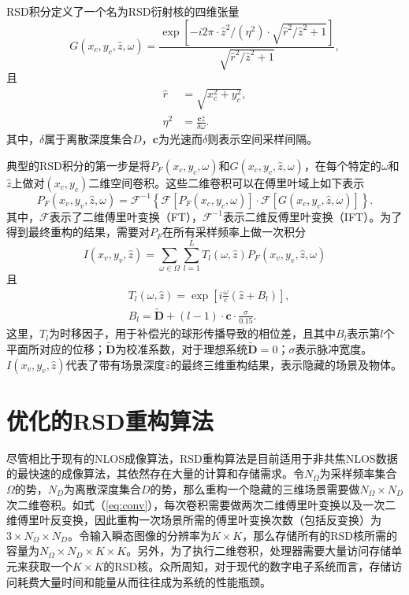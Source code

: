 \documentclass[master]{shtthesis}             %
\begin{document}
RSD积分定义了一个名为RSD衍射核的四维张量
\begin{equation}\label{eq:kernel}
  G(x_c,y_c,\hat{z},\omega) = \frac{\exp\left[-i2\pi\cdot\hat{z}^2/(\eta^2)\cdot\sqrt{\hat{r}^2/\hat{z}^2+1}\right]}{\sqrt{\hat{r}^2/\hat{z}^2+1}},
\end{equation}
且
\begin{align}
  \hat{r} &= \sqrt{x_c^2+y_c^2}\label{eq:rxy},\\
  \eta^2 &= \frac{\mathbf{c}\hat{z}}{\delta\omega}.
\end{align}
其中，$\delta$属于离散深度集合$D$，$\mathbf{c}$为光速而$\delta$则表示空间采样间隔。

典型的RSD积分的第一步是将$P_F(x_c,y_c,\omega)$和$G(x_c,y_c,\hat{z},\omega)$，在每个特定的$\omega$和$\hat{z}$上做对$(x_c,y_c)$二维空间卷积。这些二维卷积可以在傅里叶域上如下表示
\begin{equation}\label{eq:conv}
  P_F(x_v, y_v, \hat{z}, \omega) = \mathcal{F}^{-1}\left\{\mathcal{F}\left[P_F(x_c, y_c, \omega)\right]\cdot \mathcal{F}\left[G(x_c, y_c, \hat{z}, \omega)\right]\right\}.
\end{equation}
其中，$\mathcal{F}$表示了二维傅里叶变换（FT），$\mathcal{F}^{-1}$表示二维反傅里叶变换（IFT）。为了得到最终重构的结果，需要对$P_F$在所有采样频率上做一次积分
\begin{equation}
  I(x_v, y_v, \hat{z}) = \sum_{\omega \in  {\Omega}}\sum_{l=1}^{L} T_l(\omega, \hat{z}) P_F(x_v, y_v, \hat{z}, \omega)
\end{equation}
且
\begin{align}
    &T_l(\omega, \hat{z}) = \exp\left[i\frac{\omega}{c}(\hat{z}+B_l)\right],\label{eq:ts} \\
    &B_l =\tilde{\mathbf{D}} + (l-1)\cdot \mathbf{c}\cdot \frac{\sigma}{0.15}.
\end{align}
这里，$T_l$为时移因子，用于补偿光的球形传播导致的相位差，且其中$B_l$表示第$l$个平面所对应的位移；$\tilde{\mathbf{D}}$为校准系数，对于理想系统$\tilde{\mathbf{D}}=0$；$\sigma$表示脉冲宽度。$I(x_v,y_v,\hat{z})$代表了带有场景深度$\hat{z}$的最终三维重构结果，表示隐藏的场景及物体。

\section{优化的RSD重构算法}

尽管相比于现有的NLOS成像算法，RSD重构算法是目前适用于非共焦NLOS数据的最快速的成像算法，其依然存在大量的计算和存储需求。令$N_\Omega$为采样频率集合$\Omega$的势，$N_D$为离散深度集合$D$的势，那么重构一个隐藏的三维场景需要做$N_\Omega\times N_D$次二维卷积。如式（\ref{eq:conv}），每次卷积需要做两次二维傅里叶变换以及一次二维傅里叶反变换，因此重构一次场景所需的傅里叶变换次数（包括反变换）为$3\times N_\Omega \times N_D$。令输入瞬态图像的分辨率为$K\times K$，那么存储所有的RSD核所需的容量为$N_\Omega\times N_D\times K\times K$。另外，为了执行二维卷积，处理器需要大量访问存储单元来获取一个$K\times K$的RSD核。众所周知，对于现代的数字电子系统而言，存储访问耗费大量时间和能量从而往往成为系统的性能瓶颈\citep{Bai2018}。
\end{document}
